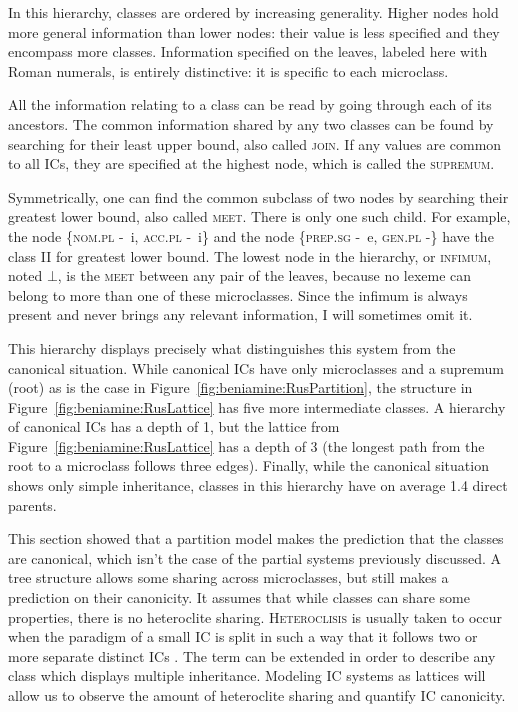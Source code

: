 \documentclass[output=paper]{langscibook}
\begin{document}
    In this hierarchy, classes are ordered by increasing generality. Higher nodes hold more general information than lower nodes: their value is less specified and they encompass more classes. Information specified on the leaves, labeled here with Roman numerals, is entirely distinctive: it is specific to each microclass. 

    All the information relating to a class can be read by going through each of its ancestors. The common information shared by any two classes can be found by searching for their least upper bound, also called \textsc{join}. If any values are common to all ICs, they are specified at the highest node, which is called the \textsc{supremum}.
    
    Symmetrically, one can find the common subclass of two nodes by searching their greatest lower bound, also called \textsc{meet}. There is only one such child. For example, the node \{\textsc{nom.pl} \unit{-i}, \textsc{acc.pl} \unit{-i}\} and the node \{\textsc{prep.sg} \unit{-e}, \textsc{gen.pl} -\} have the class II for greatest lower bound. The lowest node in the hierarchy, or \textsc{infimum}, noted $\bot$, is the \textsc{meet} between any pair of the leaves, because no lexeme can belong to more than one of these microclasses. Since the infimum is always present and never brings any relevant information, I will sometimes omit it. 
    
    This hierarchy displays precisely what distinguishes this system from the can\-on\-ical situation. While canonical ICs have only microclasses and a supremum (root) as is the case in Figure~\ref{fig:beniamine:RusPartition}, the structure in Figure~\ref{fig:beniamine:RusLattice} has five more intermediate classes. A hierarchy of canonical ICs has a depth of 1, but the lattice from Figure~\ref{fig:beniamine:RusLattice} has a depth of 3 (the longest path from the root to a microclass follows three edges). Finally, while the canonical situation shows only simple inheritance, classes in this hierarchy have on average 1.4 direct parents. 
    
    This section showed that a partition model makes the prediction that the class\-es are canonical, which isn't the case of the partial systems previously discussed. A tree structure allows some sharing across microclasses, but still makes a prediction on their canonicity. It assumes that while classes can share some properties, there is no heteroclite sharing. \textsc{Heteroclisis} is usually taken to occur when the paradigm of a small IC is split in such a way that it follows two or more separate distinct ICs  \citep{Corbett2009}. The term can be extended in order to describe any class which displays multiple inheritance. Modeling IC systems as lattices will allow us to observe the amount of heteroclite sharing and quantify IC canonicity.
    
\end{document}
